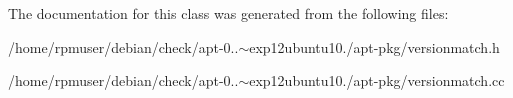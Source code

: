 \-The documentation for this class was generated from the following files\-:\begin{DoxyCompactItemize}
\item 
/home/rpmuser/debian/check/apt-\/0..$\sim$exp12ubuntu10./apt-\/pkg/versionmatch.\-h\item 
/home/rpmuser/debian/check/apt-\/0..$\sim$exp12ubuntu10./apt-\/pkg/versionmatch.\-cc\end{DoxyCompactItemize}
